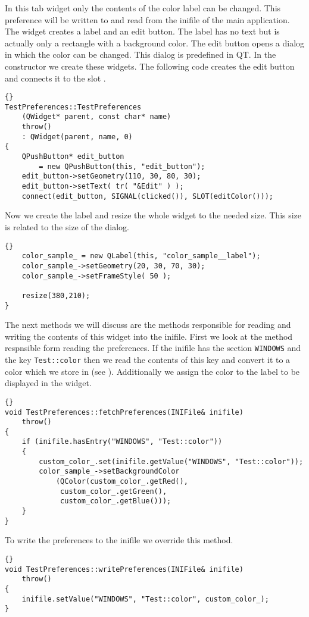 In this tab widget only the contents of the color label can be changed.
This preference will be written to and read from the inifile of the main application.
The widget creates a label and an edit button. The label has no text but is
actually only a rectangle with a background color. The edit button opens a dialog
in which the color can be changed. This dialog is predefined in QT.
In the constructor we create these widgets.
The following code creates the edit button and connects it to the slot .
\begin{lstlisting}{}
TestPreferences::TestPreferences
	(QWidget* parent, const char* name)
	throw()
	: QWidget(parent, name, 0)
{
	QPushButton* edit_button 
		= new QPushButton(this, "edit_button");
	edit_button->setGeometry(110, 30, 80, 30);
	edit_button->setText( tr( "&Edit" ) );
	connect(edit_button, SIGNAL(clicked()), SLOT(editColor()));
\end{lstlisting}
Now we create the label and resize the whole widget to the needed size. This
size is related to the size of the  dialog.
\begin{lstlisting}{}
	color_sample_ = new QLabel(this, "color_sample__label");
	color_sample_->setGeometry(20, 30, 70, 30);
	color_sample_->setFrameStyle( 50 );
	
	resize(380,210);
}
\end{lstlisting}

The next methods we will discuss are the methods responsible for reading and
writing the contents of this widget into the inifile. First we look at the
method respnsible form reading the preferences.
If the inifile has the section {\tt WINDOWS} and the key {\tt Test::color} then
we read the contents of this key and convert it to a color which we store in
 (see ). Additionally we assign the color to the label to be displayed in the widget.
\begin{lstlisting}{}
void TestPreferences::fetchPreferences(INIFile& inifile)
	throw()
{
	if (inifile.hasEntry("WINDOWS", "Test::color"))
	{
		custom_color_.set(inifile.getValue("WINDOWS", "Test::color"));
		color_sample_->setBackgroundColor
			(QColor(custom_color_.getRed(), 
			 custom_color_.getGreen(), 
			 custom_color_.getBlue()));
	}
}
\end{lstlisting}

To write the preferences to the inifile we override this method.

\begin{lstlisting}{}
void TestPreferences::writePreferences(INIFile& inifile)
	throw()
{
	inifile.setValue("WINDOWS", "Test::color", custom_color_);
}
\end{lstlisting}

